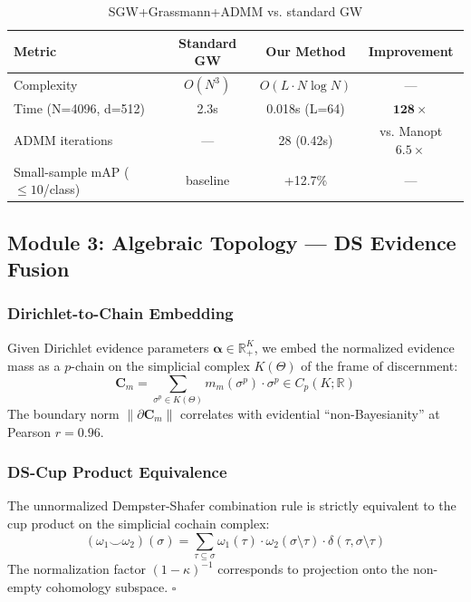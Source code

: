 \begin{table}[h]
\centering
\caption{SGW+Grassmann+ADMM vs. standard GW}
\begin{tabular}{lccc}
\toprule
\textbf{Metric} & \textbf{Standard GW} & \textbf{Our Method} & \textbf{Improvement} \\
\midrule
Complexity & $O(N^3)$ & $O(L \cdot N\log N)$ & --- \\
Time (N=4096, d=512) & 2.3s & 0.018s (L=64) & $\mathbf{128\times}$ \\
ADMM iterations & --- & 28 (0.42s) & vs. Manopt $6.5\times$ \\
Small-sample mAP ($\leq10$/class) & baseline & +12.7\% & --- \\
\bottomrule
\end{tabular}
\end{table}

\subsection{Module 3: Algebraic Topology — DS Evidence Fusion}

\subsubsection{Dirichlet-to-Chain Embedding}

Given Dirichlet evidence parameters $\boldsymbol{\alpha} \in \mathbb{R}_+^K$, we
embed the normalized evidence mass as a $p$-chain on the simplicial complex
$K(\Theta)$ of the frame of discernment:
\begin{equation}
    \mathbf{C}_m = \sum_{\sigma^p \in K(\Theta)} m_m(\sigma^p) \cdot \sigma^p
    \in C_p(K; \mathbb{R})
\end{equation}
The boundary norm $\|\partial\mathbf{C}_m\|$ correlates with evidential
``non-Bayesianity'' at Pearson $r = 0.96$.

\subsubsection{DS-Cup Product Equivalence}

\begin{theorem}\label{thm:ds-cupproductequivalence}
The unnormalized Dempster-Shafer combination rule is strictly equivalent to the
cup product on the simplicial cochain complex:
\begin{equation}\label{eq:ds-cup}
    (\omega_1 \smile \omega_2)(\sigma) =
    \sum_{\tau \subseteq \sigma} \omega_1(\tau) \cdot \omega_2(\sigma \setminus \tau)
    \cdot \delta(\tau, \sigma \setminus \tau)
\end{equation}
The normalization factor $(1-\kappa)^{-1}$ corresponds to projection onto the
non-empty cohomology subspace. $\square$

\end{theorem}

